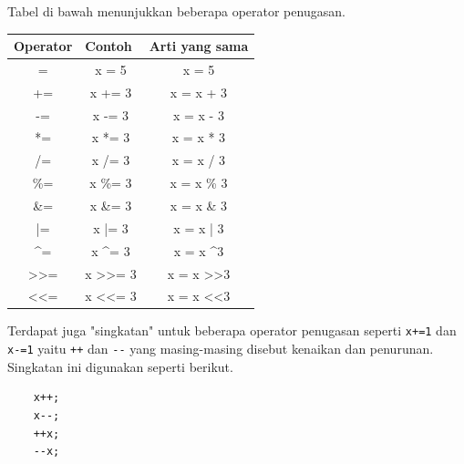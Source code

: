 Tabel di bawah menunjukkan beberapa operator penugasan.
\begin{center}
	\begin{tabular}{|c|c|c|}
		\hline
		\multicolumn{1}{|l|}{Operator} & \multicolumn{1}{l|}{Contoh}       & \multicolumn{1}{l|}{Arti yang sama} \\ \hline
		=                              & x = 5                             & x = 5                               \\ \hline
		+=                             & x += 3                            & x = x + 3                           \\ \hline
		-=                             & x -= 3                            & x = x - 3                           \\ \hline
		*=                             & x *= 3                            & x = x * 3                           \\ \hline
		/=                             & x /= 3                            & x = x / 3                           \\ \hline
		\%=                            & x \%= 3                           & x = x \% 3                          \\ \hline
		\&=                            & x \&= 3                           & x = x \& 3                          \\ \hline
		|=                             & x |= 3                            & x = x | 3                           \\ \hline
		\textasciicircum{}=            & x \textasciicircum{}= 3           & x = x \textasciicircum 3            \\ \hline
		\textgreater{}\textgreater{}=  & x \textgreater{}\textgreater{}= 3 & x = x \textgreater{}\textgreater 3  \\ \hline
		\textless{}\textless{}=        & x \textless{}\textless{}= 3       & x = x \textless{}\textless 3        \\ \hline
	\end{tabular}
\end{center}
Terdapat juga "singkatan" untuk beberapa operator penugasan seperti \verb*|x+=1| dan \verb*|x-=1| yaitu \verb*|++| dan \verb*|--| yang masing-masing disebut kenaikan dan penurunan.
Singkatan ini digunakan seperti berikut.
\begin{verbatim}
    x++;
    x--;
    ++x;
    --x;
\end{verbatim}

